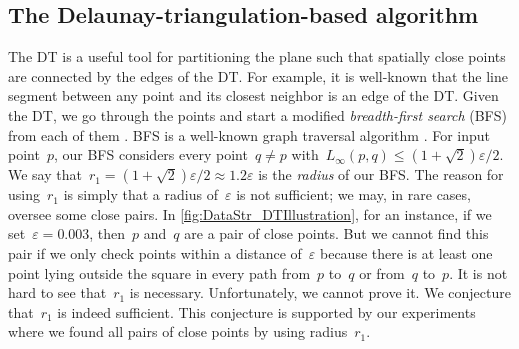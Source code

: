 \subsection{The Delaunay-triangulation-based algorithm}
\label{sec:DataStr_DTAlgorithm} 

The DT is a useful tool for partitioning the plane 
such that spatially close points are connected
by the edges of the DT. 
For example, it is well-known that
the line segment between any point and its closest neighbor
is an edge of the DT.
Given the DT, we go through the points 
and start a modified \emph{breadth-first search} (BFS) 
from each of them
\parencite[e.g.,][]{Maus2010AllCN,Rahmati2013}. 
BFS is a well-known graph traversal algorithm
\parencite[chapter 22]{Cormen2009}. 
For input point~$p$, 
our BFS considers every point~$q\ne p$ 
with~$L_{\infty}(p,q)\le (1+\sqrt{2})\varepsilon /2$. 
We say that~$r_{1}=(1+\sqrt{2})\varepsilon /2\approx 
1.2\varepsilon$ 
is the \emph{radius} of our BFS. 
The reason for using~$r_{1} $ is simply that 
a radius of~$\varepsilon$ is not sufficient; 
we may, in rare cases, oversee some close pairs. 
In \fig\ref{fig:DataStr_DTIllustration}, for an instance, 
if we set~$\varepsilon =0.003$, 
then~$p$ and~$q$ are a pair of close points. 
But we cannot find this pair if we only check points 
within a distance of~$\varepsilon$
because there is at least one point lying outside the square 
in every path from~$p$ to~$q$ or from~$q$ to~$p$. 
It is not hard to see that~$r_{1}$ is necessary. Unfortunately, we cannot prove it. 
We conjecture that~$r_{1}$ is indeed sufficient. 
This conjecture is supported by our experiments where 
we found all pairs of close points by using radius~$r_{1}$.



